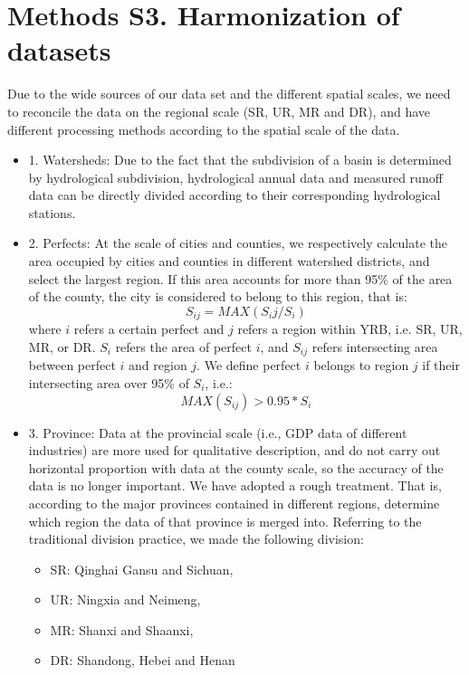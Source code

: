 \documentclass[9pt,twoside,lineno]{pnas-new}
\begin{document}
\section*{Methods S3. Harmonization of datasets}
Due to the wide sources of our data set and the different spatial scales, we need to reconcile the data on the regional scale (SR, UR, MR and DR), and have different processing methods according to the spatial scale of the data.
\begin{itemize}
    \item 1. Watersheds:
        Due to the fact that the subdivision of a basin is determined by hydrological subdivision, hydrological annual data and measured runoff data can be directly divided according to their corresponding hydrological stations.
    \item 2. Perfects:
        At the scale of cities and counties, we respectively calculate the area occupied by cities and counties in different watershed districts, and select the largest region. If this area accounts for more than 95\% of the area of the county, the city is considered to belong to this region, that is:
        $$ S_{ij} = MAX(S_ij / S_i)$$
        where $i$ refers a certain perfect and $j$ refers a region within YRB, i.e. SR, UR, MR, or DR. $S_i$ refers the area of perfect $i$, and $S_{ij}$ refers intersecting area between perfect $i$ and region $j$.
        We define perfect $i$ belongs to region $j$ if their intersecting area over 95\% of $S_i$, i.e.:
        $$ MAX(S_{ij}) > 0.95 * S_i $$
    \item 3. Province:
    Data at the provincial scale (i.e., GDP data of different industries) are more used for qualitative description, and do not carry out horizontal proportion with data at the county scale, so the accuracy of the data is no longer important. We have adopted a rough treatment. That is, according to the major provinces contained in different regions, determine which region the data of that province is merged into. Referring to the traditional division practice, we made the following division:
    \begin{itemize}
        \item SR: Qinghai Gansu and Sichuan,
        \item UR: Ningxia and Neimeng,
        \item MR: Shanxi and Shaanxi,
        \item DR: Shandong, Hebei and Henan
    \end{itemize}
\end{itemize}
\end{document}
